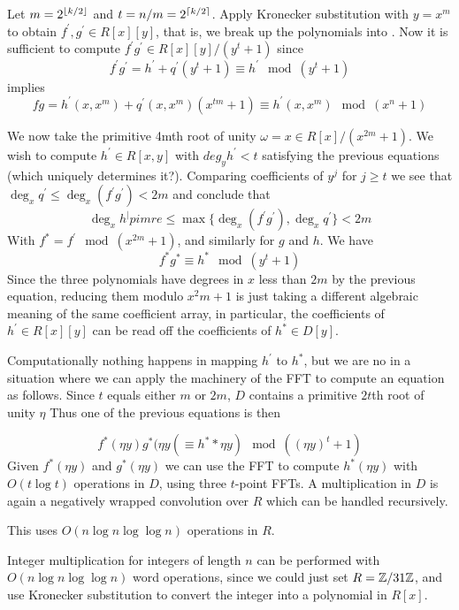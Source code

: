 Let $m = 2^{\left \lfloor k / 2 \right \rfloor}$ and $t = n/m = 2^{\left \lceil k/2 \right \rceil}$. Apply Kronecker substitution with $y = x^m$ to obtain $f^\prime, g^\prime \in R[x][y]$, that is, we break up the polynomials into . Now it is sufficient to compute $f^\prime g^\prime \in R[x][y] /(y^t + 1)$ since
\[
  f^\prime g^\prime = h^\prime + q^\prime (y^t + 1) \equiv h^\prime \mod (y^t + 1)
\]
implies
\[
    fg = h^\prime (x, x^m) + q^\prime(x, x^m)(x^{tm} + 1) \equiv h^\prime(x, x^m) \mod (x^n + 1)
\]

We now take the primitive 4mth root of unity $\omega = x \in R[x] / (x^{2m} + 1)$. We wish to compute $h^\prime \in R[x, y]$ with $deg_y h^\prime < t$ satisfying the previous equations (which uniquely determines it?). Comparing coefficients of $y^j$ for $j \ge t$ we see that $\deg_x q^\prime \le \deg_x (f^\prime g^\prime) < 2m$ and conclude that 
\[
    \deg_x h^|pimre \le \max \{ \deg_x(f^\prime g^\prime), \deg_x q^\prime \} < 2m
\]
With $f^\ast = f^\prime \mod (x^{2m} + 1)$, and similarly for $g$ and $h$. We have
\[
    f^\ast g^\ast \equiv h^\ast \mod (y^t + 1) 
\]
Since the three polynomials have degrees in $x$ less than $2m$ by the previous equation, reducing them modulo $x^2m + 1$ is just taking a different algebraic meaning of the same coefficient array, in particular, the coefficients of $h^\prime \in R[x][y]$ can be read off the coefficients of $h^\ast \in D[y]$.

Computationally nothing happens in mapping $h^\prime$ to $h^\ast$, but we are no in a situation where we can apply the machinery of the FFT to compute an equation as follows. Since $t$ equals either $m$ or $2m$, $D$ contains a primitive $2t$th root of unity $\eta$
Thus one of the previous equations is then

\[
    f^\ast(\eta y)g^\ast(\eta y( \equiv h^\ast*\eta y) \mod ((\eta y)^t + 1)
\]
Given $f^\ast(\eta y)$ and $g^\ast(\eta y)$ we can use the FFT to compute $h^\ast(\eta y)$ with $O(t \log t)$ operations in $D$, using three $t$-point FFTs. A multiplication in $D$ is again a negatively wrapped convolution over $R$ which can be handled recursively.

This uses $O(n \log n \log \log n)$ operations in $R$.

Integer multiplication for integers of length $n$ can be performed with $O(n \log n \log \log n)$ word operations, since we could just set $R = {\mathbb Z} / 31{\mathbb Z}$, and use Kronecker substitution to convert the integer into a polynomial in $R[x]$.
